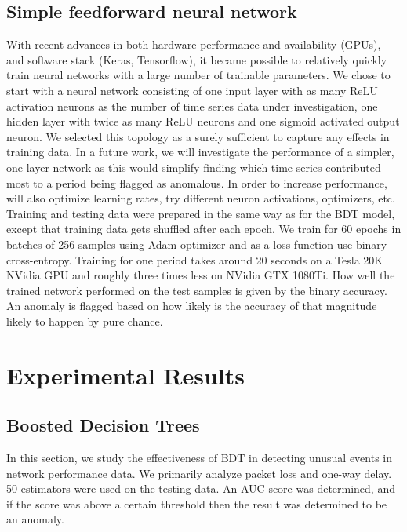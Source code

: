 \documentclass[5p]{elsarticle}
\begin{document}
\subsection{Simple feedforward neural network}

With recent advances in both hardware performance and availability (GPUs), and software stack (Keras, Tensorflow), it became possible to relatively quickly train neural networks with a large number of trainable parameters. We chose to start with a neural network consisting of one input layer with as many ReLU activation neurons as the number of time series data under investigation, one hidden layer with twice as many ReLU neurons and one sigmoid activated output neuron. We selected this topology as a surely sufficient to capture any effects in training data. In a future work, we will investigate the performance of a simpler, one layer network as this would simplify finding which time series contributed most to a period being flagged as anomalous. In order to increase performance, will also optimize learning rates, try different neuron activations, optimizers,  etc.  
Training and testing data were prepared in the same way as for the BDT model, except that training data gets shuffled after each epoch. We train for 60 epochs in batches of 256 samples using Adam optimizer \cite{jedanaest} and as a loss function use binary cross-entropy. Training for one period takes around 20 seconds on a Tesla 20K NVidia GPU and roughly three times less on NVidia GTX 1080Ti. How well the trained network performed on the test samples is given by the binary accuracy. An anomaly is flagged based on how likely is the accuracy of that magnitude likely to happen by pure chance.

\section{Experimental Results}

\subsection{Boosted Decision Trees}

In this section, we study the effectiveness of BDT in detecting unusual events in network performance data. We primarily analyze packet loss and one-way delay. 50 estimators were used on the testing data. An AUC score was determined, and if the score was above a certain threshold then the result was determined to be an anomaly.
\end{document}
